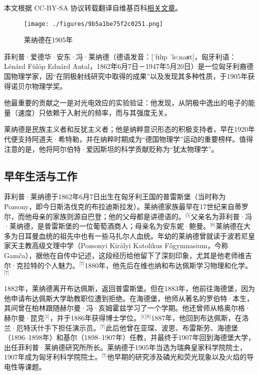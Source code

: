 
本文根据 CC-BY-SA 协议转载翻译自维基百科\href{https://en.wikipedia.org/wiki/Philipp_Lenard}{相关文章}。

\begin{figure}[ht]
\centering
\texttt{[image: ./figures/9b5a1be75f2c0251.png]}
\caption{莱纳德在1905年} \label{fig_FLPL_3}
\end{figure}
菲利普·爱德华·安东·冯·莱纳德（德语发音：[ˈfɪlɪp ˈleːnaʁt]，匈牙利语：Lénárd Fülöp Eduárd Antal，1862年6月7日－1947年5月20日）是一位匈牙利裔德国物理学家，因“在阴极射线研究中取得的成果”以及发现其多种性质，于1905年获得诺贝尔物理学奖。

他最重要的贡献之一是对光电效应的实验验证：他发现，从阴极中逸出的电子的能量（速度）只依赖于入射光的频率，而与其强度无关。

莱纳德是民族主义者和反犹主义者；他是纳粹意识形态的积极支持者，早在1920年代便支持阿道夫·希特勒，并在纳粹时期成为“德国物理学”运动的重要榜样。值得注意的是，他将阿尔伯特·爱因斯坦的科学贡献贬称为“犹太物理学”。

\subsection{早年生活与工作}
菲利普·莱纳德于1862年6月7日出生在匈牙利王国的普雷斯堡（当时称为 Pozsony，即今日斯洛伐克的布拉迪斯拉发）。莱纳德家族最早在17世纪来自蒂罗尔，而他母亲的家族则源自巴登；他的父母都是讲德语的。\(^\text{[5]}\)父亲名为菲利普·冯·莱纳德，是普雷斯堡的一位葡萄酒商人；母亲名为安东妮·鲍曼。\(^\text{[6]}\)莱纳德在大多为日耳曼血统的祖先中也有一些马扎尔人血统。年幼的莱纳德曾就读于波若尼皇家天主教高级文理中学（Pozsonyi Királyi Katolikus Főgymnasium，今称 Gamča），据他在自传中记述，这段经历给他留下了深刻印象，尤其是他老师维吉尔·克拉特的个人魅力。\(^\text{[7]}\)1880年，他先后在维也纳和布达佩斯学习物理和化学。\(^\text{[7]}\)

1882年，莱纳德离开布达佩斯，返回普雷斯堡。但在1883年，他前往海德堡，因为他申请布达佩斯大学助教职位遭到拒绝。在海德堡，他师从著名的罗伯特·本生，其间曾在柏林跟随赫尔曼·冯·亥姆霍兹学习了一个学期。他还曾师从格奥尔格·赫尔曼·昆克\(^\text{[1]}\)，并于1886年获得博士学位。\(^\text{[1][8]}\)1887年，他回到布达佩斯，在洛兰·厄特沃什手下担任演示员。\(^\text{[7]}\)此后他曾在亚琛、波恩、布雷斯劳、海德堡（1896–1898年）和基尔（1898–1907年）任教，并最终于1907年回到海德堡大学，出任菲利普·莱纳德研究所所长。莱纳德于1905年当选为瑞典皇家科学院院士，1907年成为匈牙利科学院院士。\(^\text{[7]}\)他早期的研究涉及磷光和荧光现象以及火焰的导电性等课题。
